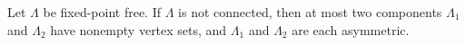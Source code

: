 Let $\Lambda$ be fixed-point free. If $\Lambda$ is not connected, then at most two components $\Lambda_1$ and $\Lambda_2$ have nonempty vertex sets, and $\Lambda_1$ and $\Lambda_2$ are each asymmetric.
